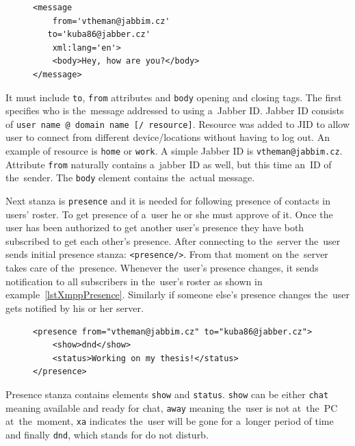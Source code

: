 \begin{figure}[h]
\begin{lstlisting}
<message 
	from='vtheman@jabbim.cz'
   to='kuba86@jabber.cz'
	xml:lang='en'>
	<body>Hey, how are you?</body>
</message>
\end{lstlisting}
\end{figure}

It must include \verb|to|, \verb|from| attributes and \verb|body| opening and closing tags. The first specifies who is the~message addressed to using a~Jabber ID. Jabber ID consists of \newline\verb|user name @ domain name [/ resource]|. Resource was added to JID to allow user to connect from different device/locations without having to log out. An example of resource is \verb|home| or \verb|work|. A simple Jabber ID is \verb|vtheman@jabbim.cz|. Attribute \verb|from| naturally contains a~jabber ID as well, but this time an~ID of the~sender. The \verb|body| element contains the~actual message. 

Next stanza is \verb|presence| and it is needed for following presence of contacts in users' roster. To get presence of a~user he or she must approve of it. Once the user has been authorized to get another user's presence they have both subscribed to get each other's presence. After connecting to the~server the~user sends initial presence stanza: \verb|<presence/>|. From that moment on the~server takes care of the~presence. Whenever the~user's presence changes, it sends notification to all subscribers in the~user's roster as shown in example~\ref{lstXmppPresence}. Similarly if someone else's presence changes the~user gets notified by his or her server.  

\begin{figure}[h]
\begin{lstlisting}
<presence from="vtheman@jabbim.cz" to="kuba86@jabber.cz">
	<show>dnd</show>
	<status>Working on my thesis!</status>
</presence>
\end{lstlisting}
\end{figure}

Presence stanza contains elements \verb|show| and \verb|status|. \verb|show| can be either \verb|chat| meaning available and ready for chat, \verb|away| meaning the~user is not at~the~PC at~the~moment, \verb|xa| indicates the~user will be gone for a~longer period of time and finally \verb|dnd|, which stands for do not disturb.  

